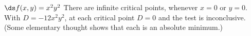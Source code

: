 {$\ds f(x,y) = x^2y^2$
}
{
There are infinite critical points, whenever $x=0$ or $y=0$. With $D = -12x^2y^2$, at each critical point $D = 0$ and the test is inconclusive. (Some elementary thought shows that each is an absolute minimum.)
}